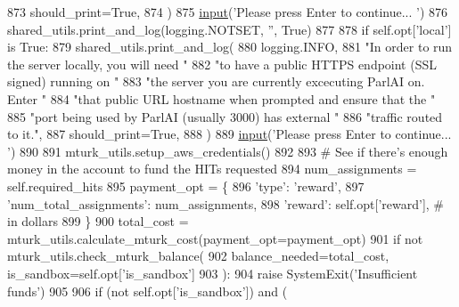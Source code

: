 \begin{DoxyCode}
873                 should\_print=\textcolor{keyword}{True},
874             )
875         \hyperlink{namespaceparlai_1_1mturk_1_1core_1_1dev_1_1test_1_1test__full__system_a1e1817cd65688fb90f827834d1fb4567}{input}(\textcolor{stringliteral}{'Please press Enter to continue... '})
876         shared\_utils.print\_and\_log(logging.NOTSET, \textcolor{stringliteral}{''}, \textcolor{keyword}{True})
877 
878         \textcolor{keywordflow}{if} self.opt[\textcolor{stringliteral}{'local'}] \textcolor{keywordflow}{is} \textcolor{keyword}{True}:
879             shared\_utils.print\_and\_log(
880                 logging.INFO,
881                 \textcolor{stringliteral}{"In order to run the server locally, you will need "}
882                 \textcolor{stringliteral}{"to have a public HTTPS endpoint (SSL signed) running on "}
883                 \textcolor{stringliteral}{"the server you are currently excecuting ParlAI on. Enter "}
884                 \textcolor{stringliteral}{"that public URL hostname when prompted and ensure that the "}
885                 \textcolor{stringliteral}{"port being used by ParlAI (usually 3000) has external "}
886                 \textcolor{stringliteral}{"traffic routed to it."},
887                 should\_print=\textcolor{keyword}{True},
888             )
889             \hyperlink{namespaceparlai_1_1mturk_1_1core_1_1dev_1_1test_1_1test__full__system_a1e1817cd65688fb90f827834d1fb4567}{input}(\textcolor{stringliteral}{'Please press Enter to continue... '})
890 
891         mturk\_utils.setup\_aws\_credentials()
892 
893         \textcolor{comment}{# See if there's enough money in the account to fund the HITs requested}
894         num\_assignments = self.required\_hits
895         payment\_opt = \{
896             \textcolor{stringliteral}{'type'}: \textcolor{stringliteral}{'reward'},
897             \textcolor{stringliteral}{'num\_total\_assignments'}: num\_assignments,
898             \textcolor{stringliteral}{'reward'}: self.opt[\textcolor{stringliteral}{'reward'}],  \textcolor{comment}{# in dollars}
899         \}
900         total\_cost = mturk\_utils.calculate\_mturk\_cost(payment\_opt=payment\_opt)
901         \textcolor{keywordflow}{if} \textcolor{keywordflow}{not} mturk\_utils.check\_mturk\_balance(
902             balance\_needed=total\_cost, is\_sandbox=self.opt[\textcolor{stringliteral}{'is\_sandbox'}]
903         ):
904             \textcolor{keywordflow}{raise} SystemExit(\textcolor{stringliteral}{'Insufficient funds'})
905 
906         \textcolor{keywordflow}{if} (\textcolor{keywordflow}{not} self.opt[\textcolor{stringliteral}{'is\_sandbox'}]) \textcolor{keywordflow}{and} (

\end{DoxyCode}
